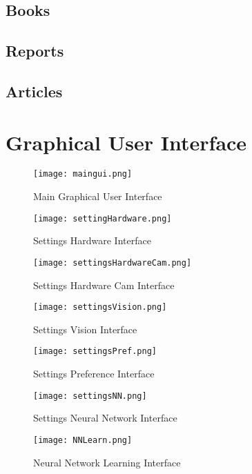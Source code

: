 \documentclass[11pt,fleqn,,a4paper,twoside,openright]{book}
\begin{document}
\section*{Books}
\printbibliography[heading=bibempty,type=book]
\section*{Reports}
\printbibliography[heading=bibempty,type=report]
\section*{Articles}
\printbibliography[heading=bibempty,type=article]

\cleardoublepage
{}
\setlength{\columnsep}{0.75cm}
\printindex

\appendix
{}
\chapter{Graphical User Interface}
\begin{figure}[h]
	\texttt{[image: maingui.png]}
	\caption{Main Graphical User Interface}
\end{figure}
\begin{figure}[h]
	\texttt{[image: settingHardware.png]}
	\caption{Settings Hardware Interface}
\end{figure}
\begin{figure}[h]
	\texttt{[image: settingsHardwareCam.png]}
	\caption{Settings Hardware Cam Interface}
\end{figure}
\begin{figure}[h]
	\texttt{[image: settingsVision.png]}
	\caption{Settings Vision Interface}
\end{figure}
\begin{figure}[h]
	\texttt{[image: settingsPref.png]}
	\caption{Settings Preference Interface}
\end{figure}
\begin{figure}[h]
	\texttt{[image: settingsNN.png]}
	\caption{Settings Neural Network Interface}
\end{figure}
\begin{figure}[h]
	\texttt{[image: NNLearn.png]}
	\caption{Neural Network Learning Interface}
\end{figure}
\end{document}
